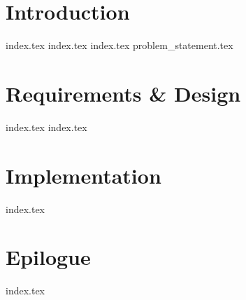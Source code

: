 \part{Introduction}\label{part:introduction}
{index.tex}
{index.tex}
{index.tex}
{problem_statement.tex}
\part{Requirements \& Design}
{index.tex}
{index.tex}
\part{Implementation}
{index.tex}
\part{Epilogue}
{index.tex}
